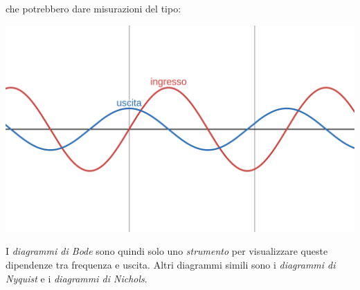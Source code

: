 \documentclass[a4paper,11pt]{article}
\begin{document}
che potrebbero dare misurazioni del tipo:

\begin{center}
	\includegraphics[scale=0.3]{../figures/in_out_sin.png}
\end{center}

I \textit{diagrammi di Bode} sono quindi solo uno \textit{strumento} per visualizzare queste dipendenze tra frequenza e uscita.
Altri diagrammi simili sono i \textit{diagrammi di Nyquist} e i \textit{diagrammi di Nichols}.
\end{document}
